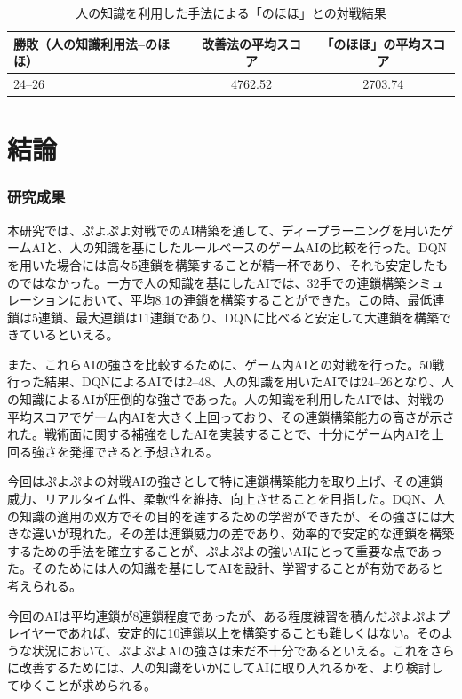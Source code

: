 \documentclass[12pt]{jarticle}
\begin{document}
\begin{table}[htb]
\begin{center}
\caption{人の知識を利用した手法による「のほほ」との対戦結果} \label{tab:human_vs}
  \begin{tabular}{|l|c|c|} \hline
勝敗（人の知識利用法--のほほ） & 改善法の平均スコア & 「のほほ」の平均スコア\\ \hline
 24--26 & 4762.52 & 2703.74\\ \hline
\end{tabular}
\end{center}
\end{table}


\part{結論} \setcounter{section}{0}
\section{研究成果}
本研究では、ぷよぷよ対戦でのAI構築を通して、ディープラーニングを用いたゲームAIと、人の知識を基にしたルールベースのゲームAIの比較を行った。DQNを用いた場合には高々5連鎖を構築することが精一杯であり、それも安定したものではなかった。一方で人の知識を基にしたAIでは、32手での連鎖構築シミュレーションにおいて、平均8.1の連鎖を構築することができた。この時、最低連鎖は5連鎖、最大連鎖は11連鎖であり、DQNに比べると安定して大連鎖を構築できているといえる。

また、これらAIの強さを比較するために、ゲーム内AIとの対戦を行った。50戦行った結果、DQNによるAIでは2--48、人の知識を用いたAIでは24--26となり、人の知識によるAIが圧倒的な強さであった。人の知識を利用したAIでは、対戦の平均スコアでゲーム内AIを大きく上回っており、その連鎖構築能力の高さが示された。戦術面に関する補強をしたAIを実装することで、十分にゲーム内AIを上回る強さを発揮できると予想される。

今回はぷよぷよの対戦AIの強さとして特に連鎖構築能力を取り上げ、その連鎖威力、リアルタイム性、柔軟性を維持、向上させることを目指した。DQN、人の知識の適用の双方でその目的を達するための学習ができたが、その強さには大きな違いが現れた。その差は連鎖威力の差であり、効率的で安定的な連鎖を構築するための手法を確立することが、ぷよぷよの強いAIにとって重要な点であった。そのためには人の知識を基にしてAIを設計、学習することが有効であると考えられる。

今回のAIは平均連鎖が8連鎖程度であったが、ある程度練習を積んだぷよぷよプレイヤーであれば、安定的に10連鎖以上を構築することも難しくはない。そのような状況において、ぷよぷよAIの強さは未だ不十分であるといえる。これをさらに改善するためには、人の知識をいかにしてAIに取り入れるかを、より検討してゆくことが求められる。
\end{document}
